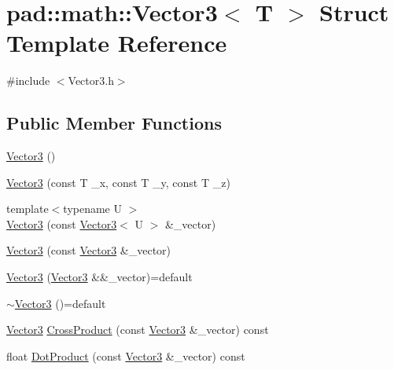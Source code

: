 \hypertarget{structpad_1_1math_1_1_vector3}{}\section{pad\+:\+:math\+:\+:Vector3$<$ T $>$ Struct Template Reference}
\label{structpad_1_1math_1_1_vector3}


{\ttfamily \#include $<$Vector3.\+h$>$}

\subsection*{Public Member Functions}
\begin{DoxyCompactItemize}
\item 
\mbox{\hyperlink{structpad_1_1math_1_1_vector3_a06aefc4e209e7e8ab954c9124e9f663f}{Vector3}} ()
\item 
\mbox{\hyperlink{structpad_1_1math_1_1_vector3_a0770fb886ae92f895ce0258e28a1a1eb}{Vector3}} (const T \+\_\+x, const T \+\_\+y, const T \+\_\+z)
\item 
{\footnotesize template$<$typename U $>$ }\\\mbox{\hyperlink{structpad_1_1math_1_1_vector3_a7f6a17638301c9ddaec4ea300a3c846a}{Vector3}} (const \mbox{\hyperlink{structpad_1_1math_1_1_vector3}{Vector3}}$<$ U $>$ \&\+\_\+vector)
\item 
\mbox{\hyperlink{structpad_1_1math_1_1_vector3_a08af6d6eca643fe525839844c5790e6f}{Vector3}} (const \mbox{\hyperlink{structpad_1_1math_1_1_vector3}{Vector3}} \&\+\_\+vector)
\item 
\mbox{\hyperlink{structpad_1_1math_1_1_vector3_adf7a624bdd20e8d79c6fe663c36ce43b}{Vector3}} (\mbox{\hyperlink{structpad_1_1math_1_1_vector3}{Vector3}} \&\&\+\_\+vector)=default
\item 
\mbox{\hyperlink{structpad_1_1math_1_1_vector3_a8a778f1112409992f9e95a10f9760cfd}{$\sim$\+Vector3}} ()=default
\item 
\mbox{\hyperlink{structpad_1_1math_1_1_vector3}{Vector3}} \mbox{\hyperlink{structpad_1_1math_1_1_vector3_ac2e50febe3b0e838a515ad17017050c8}{Cross\+Product}} (const \mbox{\hyperlink{structpad_1_1math_1_1_vector3}{Vector3}} \&\+\_\+vector) const
\item 
float \mbox{\hyperlink{structpad_1_1math_1_1_vector3_adf5f36332f64f4d6e90144e514e8c84c}{Dot\+Product}} (const \mbox{\hyperlink{structpad_1_1math_1_1_vector3}{Vector3}} \&\+\_\+vector) const
\item 

\end{DoxyCompactItemize}
